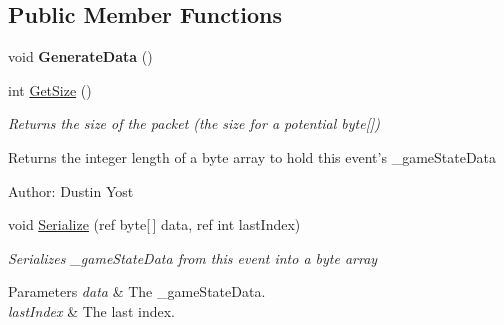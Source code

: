 \subsection*{Public Member Functions}
\begin{DoxyCompactItemize}
\item 
\hypertarget{class_skyrates_1_1_server_1_1_network_1_1_event_1_1_event_update_game_state_abe441043e0e25e0cc0125877636c16bc}{void {\bfseries Generate\-Data} ()}\label{class_skyrates_1_1_server_1_1_network_1_1_event_1_1_event_update_game_state_abe441043e0e25e0cc0125877636c16bc}

\item 
\hypertarget{class_skyrates_1_1_server_1_1_network_1_1_event_1_1_event_update_game_state_aeec7bfb004a337c42cb3040d38abef38}{int \hyperlink{class_skyrates_1_1_server_1_1_network_1_1_event_1_1_event_update_game_state_aeec7bfb004a337c42cb3040d38abef38}{Get\-Size} ()}\label{class_skyrates_1_1_server_1_1_network_1_1_event_1_1_event_update_game_state_aeec7bfb004a337c42cb3040d38abef38}

\begin{DoxyCompactList}\small\item\em Returns the size of the packet (the size for a potential byte\mbox{[}\mbox{]}) 

\begin{DoxyReturn}{Returns}
the integer length of a byte array to hold this event's \-\_\-game\-State\-Data 
\end{DoxyReturn}


Author\-: Dustin Yost  \end{DoxyCompactList}\item 
\hypertarget{class_skyrates_1_1_server_1_1_network_1_1_event_1_1_event_update_game_state_a060b8e03d1fe344bb2a4fdc4b0ab5814}{void \hyperlink{class_skyrates_1_1_server_1_1_network_1_1_event_1_1_event_update_game_state_a060b8e03d1fe344bb2a4fdc4b0ab5814}{Serialize} (ref byte\mbox{[}$\,$\mbox{]} data, ref int last\-Index)}\label{class_skyrates_1_1_server_1_1_network_1_1_event_1_1_event_update_game_state_a060b8e03d1fe344bb2a4fdc4b0ab5814}

\begin{DoxyCompactList}\small\item\em Serializes \-\_\-game\-State\-Data from this event into a byte array 


\begin{DoxyParams}{Parameters}
{\em data} & The \-\_\-game\-State\-Data.\\
\hline
{\em last\-Index} & The last index.\\
\hline
\end{DoxyParams}



\end{DoxyCompactList}
\end{DoxyCompactItemize}
